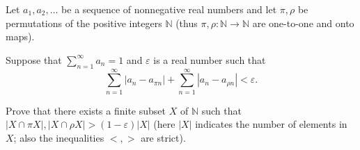 Let $a_1, a_2, \dots$ be a sequence of nonnegative real numbers and let $\pi,
\rho$ be permutations of the positive integers $\mathbb{N}$ (thus $\pi, \rho :
\mathbb{N} \to \mathbb{N}$ are one-to-one and onto maps).

Suppose that $\displaystyle{\sum_{n=1}^{\infty} a_n = 1}$ and $\varepsilon$ is
a real number such that
$$ \sum_{n=1}^{\infty} |a_n - a_{\pi n}| + \sum_{n=1}^{\infty} |a_n - a_{\rho n}| < \varepsilon. $$

Prove that there exists a finite subset $X$ of $\mathbb{N}$ such that $|X \cap
\pi X|, |X \cap \rho X| > (1 - \varepsilon)|X|$ (here $|X|$ indicates the
number of elements in $X$; also the inequalities $<, >$ are strict).

